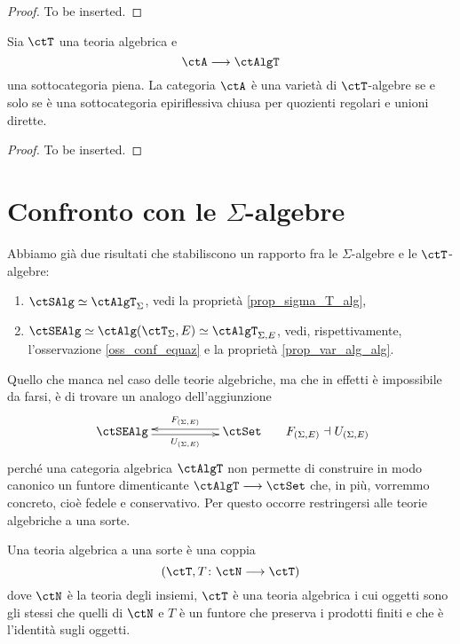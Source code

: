 \begin{proof}
To be inserted.
\end{proof}

\begin{corollary}\label{cor_th_Birkhoff_AlgT}
Sia $\ctT$ una teoria algebrica e 
\[
  \ctA \fun \ctAlgT 
\]
una sottocategoria piena. La categoria $\ctA$ è una varietà di $\ctT$-algebre se e solo se è una sottocategoria epiriflessiva
chiusa per quozienti regolari e unioni dirette.
\end{corollary}

\begin{proof}
To be inserted.
\end{proof}

\section{Confronto con le $\Sigma$-algebre}\label{sec_confr_sigma_T}

Abbiamo già due risultati che stabiliscono un rapporto fra le $\Sigma$-algebre e le $\ctT$-algebre:
\begin{enumerate}
\item $\ctSAlg \simeq \ctAlgT_{\Sigma}$, vedi la proprietà \ref{prop_sigma_T_alg},
\item $\ctSEAlg \simeq \ctAlg(\ctT_{\Sigma},E) \simeq \ctAlgT_{\Sigma,E}$, vedi, rispettivamente, l'osservazione 
\ref{oss_conf_equaz} e la proprietà \ref{prop_var_alg_alg}.
\end{enumerate}

Quello che manca nel caso delle teorie algebriche, ma che in effetti è impossibile da farsi, è di trovare un analogo
dell'aggiunzione
$$\xymatrix{\ctSEAlg \ar@<-0.5ex>[rr]_-{U_{(\Sigma,E)}} & & \ctSet \ar@<-0.5ex>[ll]_-{F_{(\Sigma,E)}}}
\;\;\;\;\;\; F_{(\Sigma,E)} \dashv U_{(\Sigma,E)}$$
perché una categoria algebrica $\ctAlgT$ non permette di construire in modo canonico un funtore dimenticante 
$\ctAlgT \fun \ctSet$ che, in più, vorremmo concreto, cioè fedele e conservativo. Per questo occorre restringersi alle 
teorie algebriche a una sorte.

\begin{definition}\label{def_th_alg_unasorte}
Una teoria algebrica a una sorte è una coppia
\[
  (\ctT, T \colon \ctN \fun \ctT) 
\]
dove $\ctN$ è la teoria degli insiemi, $\ctT$ è una teoria algebrica i cui oggetti sono gli stessi che quelli di $\ctN$ e $T$ 
è un funtore che preserva i prodotti finiti e che è l'identità sugli oggetti.
\end{definition} 

